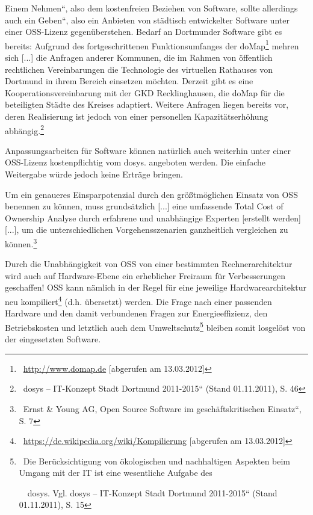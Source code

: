 \documentclass[a4paper]{article}
\newcommand\textstyleInternetlink[1]{\foreignlanguage{english}{\textcolor[rgb]{0.0,0.0,0.5019608}{#1}}}
\begin{document}
\bigskip

{
Einem {\quotedblbase}Nehmen{\textquotedblleft}, also dem kostenfreien
Beziehen von Software, sollte allerdings auch ein
{\quotedblbase}Geben{\textquotedblleft}, also ein Anbieten von
st\"adtisch entwickelter Software unter einer OSS-Lizenz
gegen\"uberstehen. Bedarf an Dortmunder Software gibt es bereits:
{\guillemotright}Aufgrund des fortgeschrittenen Funktionsumfanges der
doMap\footnote{\ \href{http://www.domap.de/}{\textstyleInternetlink{http://www.domap.de}}
[abgerufen am 13.03.2012]} mehren sich [...] die Anfragen anderer
Kommunen, die im Rahmen von \"offentlich rechtlichen Vereinbarungen die
Technologie des virtuellen Rathauses von Dortmund in ihrem Bereich
einsetzen m\"ochten. Derzeit gibt es eine Kooperationsvereinbarung mit
der GKD Recklinghausen, die doMap f\"ur die beteiligten St\"adte des
Kreises adaptiert. Weitere Anfragen liegen bereits vor, deren
Realisierung ist jedoch von einer personellen Kapazit\"atserh\"ohung
abh\"angig.{\guillemotleft}\footnote{\ dosys --
{\quotedblbase}IT-Konzept Stadt Dortmund 2011-2015{\textquotedblleft}
(Stand 01.11.2011), S. 46}}

{
Anpassungsarbeiten f\"ur Software k\"onnen nat\"urlich auch weiterhin
unter einer OSS-Lizenz kostenpflichtig vom dosys. angeboten werden. Die
einfache Weitergabe w\"urde jedoch keine Ertr\"age bringen.}


\bigskip

{
Um ein genaueres Einsparpotenzial durch den gr\"o{\ss}tm\"oglichen
Einsatz von OSS benennen zu k\"onnen, muss grunds\"atzlich
{\guillemotright} [...] eine umfassende Total Cost of Ownership Analyse
durch erfahrene und unabh\"angige Experten [erstellt werden] [...], um
die unterschiedlichen Vorgehensszenarien ganzheitlich vergleichen zu
k\"onnen.{\guillemotleft}\footnote{\ Ernst \& Young AG,
{\quotedblbase}Open Source Software im gesch\"aftskritischen
Einsatz{\textquotedblleft}, S. 7}}


\bigskip

{
Durch die Unabh\"angigkeit von OSS von einer bestimmten
Rechnerarchitektur wird auch auf Hardware-Ebene ein erheblicher
Freiraum f\"ur Verbesserungen geschaffen! OSS kann n\"amlich in der
Regel f\"ur eine jeweilige Hardwarearchitektur neu
kompiliert\footnote{\ \url{https://de.wikipedia.org/wiki/Kompilierung}
[abgerufen am 13.03.2012]} (d.h. \"ubersetzt) werden. Die Frage nach
einer passenden Hardware und den damit verbundenen Fragen zur
Energieeffizienz, den Betriebskosten und letztlich auch dem
Umweltschutz\footnote{\ Die Ber\"ucksichtigung von \"okologischen und
nachhaltigen Aspekten beim Umgang mit der IT ist eine wesentliche
Aufgabe des\par \ \ dosys. Vgl. dosys -- {\quotedblbase}IT-Konzept
Stadt Dortmund 2011-2015{\textquotedblleft} (Stand 01.11.2011), S. 15}
bleiben somit losgel\"ost von der eingesetzten Software.}
\end{document}
